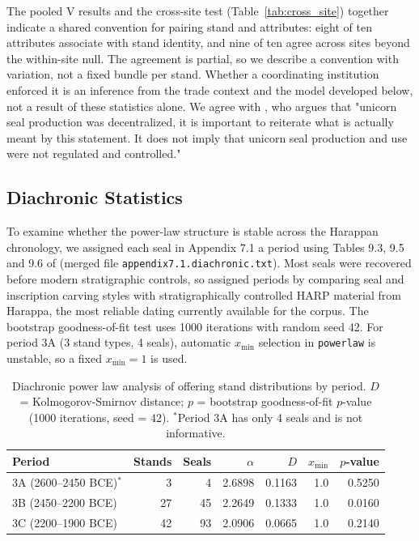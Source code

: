 \documentclass[12pt]{article}
\begin{document}
The pooled V results and the cross-site test (Table~\ref{tab:cross_site}) together
indicate a shared convention for pairing stand and attributes: eight of ten
attributes associate with stand identity, and nine of ten agree across sites
beyond the within-site null. The agreement is partial, so we describe a convention
with variation, not a fixed bundle per stand. Whether a coordinating institution
enforced it is an inference from the trade context and the model developed below,
not a result of these statistics alone. We agree with \citet{jamison2017}, who
argues that "unicorn seal production was decentralized, it is important to
reiterate what is actually meant by this statement. It does not imply that
unicorn seal production and use were not regulated and controlled."

\FloatBarrier

\subsection{Diachronic Statistics}

To examine whether the power-law structure is stable across the Harappan
chronology, we assigned each seal in Appendix 7.1 a period using Tables 9.3, 9.5
and 9.6 of \citet{jamison2017} (merged file \texttt{appendix7.1.diachronic.txt}).
Most seals were recovered before modern stratigraphic controls, so
\citet{jamison2017} assigned periods by comparing seal and inscription carving
styles with stratigraphically controlled HARP material from Harappa, the most
reliable dating currently available for the corpus. The bootstrap goodness-of-fit
test uses 1000 iterations with random seed 42. For period 3A (3 stand types,
4 seals), automatic $x_{\min}$ selection in \texttt{powerlaw} is unstable, so a
fixed $x_{\min}=1$ is used.

\begin{table}[H]
\centering
\caption{Diachronic power law analysis of offering stand distributions by period.
$D$ = Kolmogorov-Smirnov distance; $p$ = bootstrap goodness-of-fit $p$-value
(1000 iterations, seed = 42). $^*$Period 3A has only 4 seals and is not
informative.}
\label{tab:diachronic_power_law}
\begin{tabular}{@{}lrrrrrr@{}}
\toprule
Period & Stands & Seals & $\alpha$ & $D$ & $x_{\min}$ & $p$-value \\
\midrule
3A (2600--2450 BCE)$^*$ & 3 & 4 & 2.6898 & 0.1163 & 1.0 & 0.5250 \\
3B (2450--2200 BCE) & 27 & 45 & 2.2649 & 0.1333 & 1.0 & 0.0160 \\
3C (2200--1900 BCE) & 42 & 93 & 2.0906 & 0.0665 & 1.0 & 0.2140 \\
\bottomrule
\end{tabular}
\end{table}
\end{document}
